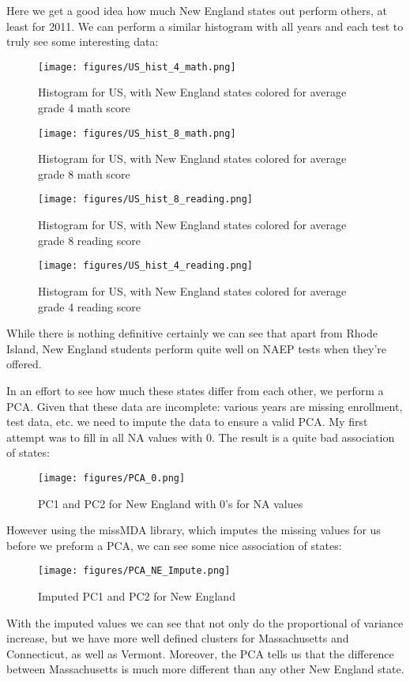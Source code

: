 \documentclass[
]{article}
\begin{document}
Here we get a good idea how much New England states out perform others, at least for 2011. We can perform a similar histogram with all years and each test to truly see some interesting data:
\begin{figure}[!h]
	\centering
	\texttt{[image: figures/US\_hist\_4\_math.png]}
	\caption{Histogram for US, with New England states  colored for average grade 4 math score}
\end{figure} 
\begin{figure}[!h]
	\centering
	\texttt{[image: figures/US\_hist\_8\_math.png]}
	\caption{Histogram for US, with New England states  colored for average grade 8 math score}
\end{figure} 
\begin{figure}[!h]
	\centering
	\texttt{[image: figures/US\_hist\_8\_reading.png]}
	\caption{Histogram for US, with New England states  colored for average grade 8 reading score}
\end{figure} 
\begin{figure}[!h]
	\centering
	\texttt{[image: figures/US\_hist\_4\_reading.png]}
	\caption{Histogram for US, with New England states colored for average grade 4 reading score}
\end{figure} 
\newpage
While there is nothing definitive certainly we can see that apart from Rhode Island, New England students perform quite well on NAEP tests when they're offered.
\clearpage
\newpage

 In an effort to see how much these states differ from each other, we perform a PCA. Given that these data are incomplete: various years are missing enrollment, test data, etc. we need to impute the data to ensure a valid PCA. My first attempt was to fill in all NA values with 0. The result is a quite bad association of states:
\begin{figure}[!ht]
	\centering
	\texttt{[image: figures/PCA\_0.png]}
	\caption{PC1 and PC2 for New England with 0's for NA values}
\end{figure} 
\newpage

However using the missMDA library, which imputes the missing values for us before we preform a PCA, we can see some nice association of states:
\begin{figure}[!ht]
	\centering
	\texttt{[image: figures/PCA\_NE\_Impute.png]}
	\caption{Imputed PC1 and PC2 for New England}
\end{figure} 

With the imputed values we can see that not only do the proportional of variance increase, but we have more well defined clusters for Massachusetts and Connecticut, as well as Vermont. Moreover, the PCA tells us that the difference between Massachusetts is much more different than any other New England state. 
\end{document}
